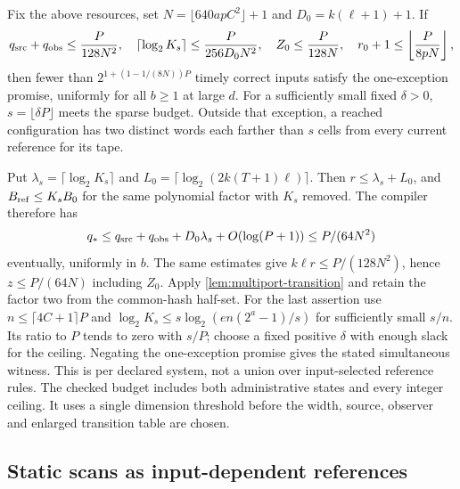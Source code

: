 \begin{corollary}\label{cor:reference-tail}
Fix the above resources, set $N=\lfloor640apC^2\rfloor+1$ and
$D_0=k(\ell+1)+1$. If
\[
 q_{\rm src}+q_{\rm obs}\le\frac P{128N^2},\quad
 \lceil\log_2 K_s\rceil\le\frac P{256D_0N^2},\quad
 Z_0\le\frac P{128N},\quad r_0+1\le\left\lfloor\frac P{8pN}\right\rfloor,
\]
then fewer than $2^{1+(1-1/(8N))P}$ timely correct inputs satisfy the
one-exception promise, uniformly for all $b\ge1$ at large $d$.
For a sufficiently small fixed $\delta>0$, $s=\lfloor\delta P\rfloor$
meets the sparse budget. Outside that exception, a reached configuration
has two distinct words each farther than $s$ cells from every current
reference for its tape.
\end{corollary}
\begin{informalproof}
Put $\lambda_s=\lceil\log_2K_s\rceil$ and
$L_0=\lceil\log_2(2k(T+1)\ell)\rceil$. Then $r\le\lambda_s+L_0$,
and $B_{\rm ref}\le K_s B_0$ for the same polynomial factor with
$K_s$ removed. The compiler therefore has
\[
 q_*\le q_{\rm src}+q_{\rm obs}+D_0\lambda_s+O(\log(P+1))
       \le P/(64N^2)
\]
eventually, uniformly in $b$. The same estimates give
$k\ell r\le P/(128N^2)$, hence $z\le P/(64N)$ including $Z_0$.
Apply \cref{lem:multiport-transition} and retain the factor two from the
common-hash half-set. For the last assertion use
$n\le\lceil4C+1\rceil P$ and
$\log_2K_s\le s\log_2(en(2^a-1)/s)$ for sufficiently small $s/n$.
Its ratio to $P$ tends to zero with $s/P$; choose a fixed positive
$\delta$ with enough slack for the ceiling. Negating the one-exception
promise gives the stated simultaneous witness. This is per declared system,
not a union over input-selected reference rules.
The checked budget includes both administrative states and every integer
ceiling. It uses a single dimension threshold before the width, source,
observer and enlarged transition table are chosen.
\end{informalproof}

\subsection{Static scans as input-dependent references}

